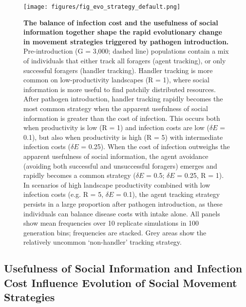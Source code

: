 \begin{figure}[p]
    \centering
    \texttt{[image: figures/fig\_evo\_strategy\_default.png]}
    \caption{
        \textbf{The balance of infection cost and the usefulness of social information together shape the rapid evolutionary change in movement strategies triggered by pathogen introduction.}
        Pre-introduction (G = 3,000; dashed line) populations contain a mix of individuals that either track all foragers (agent tracking), or only successful foragers (handler tracking).
        Handler tracking is more common on low-productivity landscapes (R = 1), where social information is more useful to find patchily distributed resources.
        After pathogen introduction, handler tracking rapidly becomes the most common strategy when the apparent usefulness of social information is greater than the cost of infection.
        This occurs both when productivity is low (R = 1) and infection costs are low ($\delta E$ = 0.1), but also when productivity is high (R = 5) with intermediate infection costs ($\delta E$ = 0.25).
        When the cost of infection outweighs the apparent usefulness of social information, the agent avoidance (avoiding both successful and unsuccessful foragers) emerges and rapidly becomes a common strategy ($\delta E$ = 0.5; $\delta E$ = 0.25, R = 1).
        In scenarios of high landscape productivity combined with low infection costs (e.g. R = 5, $\delta E$ = 0.1), the agent tracking strategy persists in a large proportion after pathogen introduction, as these individuals can balance disease costs with intake alone.
        All panels show mean frequencies over 10 replicate simulations in 100 generation bins; frequencies are stacked.
        Grey areas show the relatively uncommon `non-handler' tracking strategy.
    }\label{fig_evo_strategy}
\end{figure}

\subsection*{Usefulness of Social Information and Infection Cost Influence Evolution of Social Movement Strategies}

